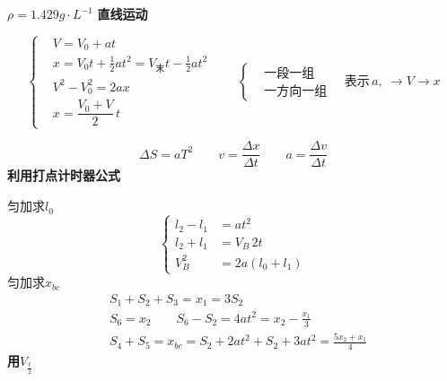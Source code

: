 $\rho=1.429\unit{g\cdot L^{-1}}$
\textbf{直线运动}

\[
\left\{\begin{aligned}
&V=V_0+at\\
&x=V_0t+\tfrac12at^2=V_{\text{末}}t-\tfrac12at^2\\
&V^2-V_0^2=2ax\\
&x=\dfrac{V_0+V}{2}\,t
\end{aligned}\right.
\qquad
\left\{\begin{aligned}
&\text{一段一组}\\
&\text{一方向一组}
\end{aligned}\right.
\quad\text{表示}\,a,\ \to V\to x
\]

\[
\Delta S=aT^2\qquad v=\frac{\Delta x}{\Delta t}\qquad a=\frac{\Delta v}{\Delta t}
\]
\textbf{利用打点计时器公式}

匀加\quad 求$l_0$
\[
\left\{\begin{aligned}
l_2-l_1&=at^2\\
l_2+l_1&=V_B\,2t\\
V_B^2&=2a(l_0+l_1)
\end{aligned}\right.
\]
匀加\quad 求$x_{bc}$
\begin{align*}
&S_1+S_2+S_3=x_1=3S_2\\
&S_6=x_2\qquad S_6-S_2=4at^2=x_2-\frac{x_1}{3}\\
&S_4+S_5=x_{bc}=S_2+2at^2+S_2+3at^2=\frac{5x_2+x_1}{4}
\end{align*}
\textbf{用$V_{\frac t2}$}

